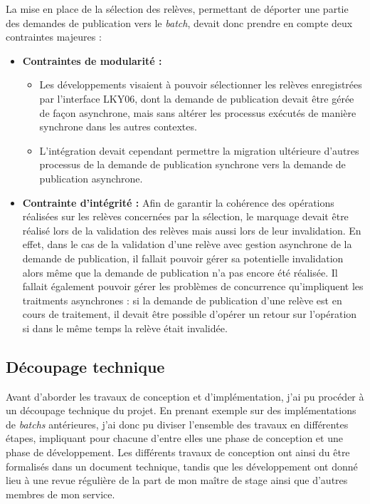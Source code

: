 \documentclass[a4paper, 12pt]{report}
\begin{document}
La mise en place de la sélection des relèves, permettant de déporter une partie des demandes de publication vers le \textit{batch}, devait donc prendre en compte deux contraintes majeures :

\clearpage

\begin{itemize}
  \item \textbf{Contraintes de modularité : }
  \begin{itemize}
    \item Les développements visaient à pouvoir sélectionner les relèves enregistrées par l'interface LKY06, dont la demande de publication devait être gérée de façon asynchrone, mais sans altérer les processus exécutés de manière synchrone dans les autres contextes.
    \item L'intégration devait cependant permettre la migration ultérieure d'autres processus de la demande de publication synchrone vers la demande de publication asynchrone. 
  \end{itemize}
  \vspace{0.5cm}
  \item \textbf{Contrainte d'intégrité :} Afin de garantir la cohérence des opérations réalisées sur les relèves concernées par la sélection, le marquage devait être réalisé lors de la validation des relèves mais aussi lors de leur invalidation. En effet, dans le cas de la validation d'une relève avec gestion asynchrone de la demande de publication, il fallait pouvoir gérer sa potentielle invalidation alors même que la demande de publication n'a pas encore été réalisée. Il fallait également pouvoir gérer les problèmes de concurrence qu'impliquent les traitments asynchrones : si la demande de publication d'une relève est en cours de traitement, il devait être possible d'opérer un retour sur l'opération si dans le même temps la relève était invalidée.
\end{itemize}

\subsection{Découpage technique}

Avant d'aborder les travaux de conception et d'implémentation, j'ai pu procéder à un découpage technique du projet. En prenant exemple sur des implémentations de \textit{batchs} antérieures, j'ai donc pu diviser l'ensemble des travaux en différentes étapes, impliquant pour chacune d'entre elles une phase de conception et une phase de développement. Les différents travaux de conception ont ainsi du être formalisés dans un document technique, tandis que les développement ont donné lieu à une revue régulière de la part de mon maître de stage ainsi que d'autres membres de mon service.
\end{document}
